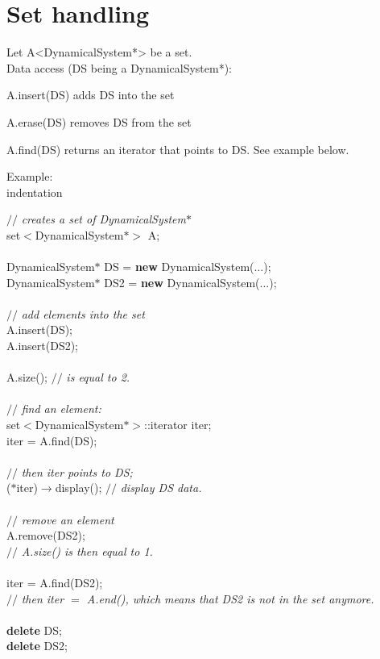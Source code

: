 \documentclass[10pt]{article}
\begin{document}
\section{Set handling}

Let A<DynamicalSystem*> be a set. \\

Data access (DS being a DynamicalSystem*):
\bei
\item A.insert(DS) adds DS into the set
\item A.erase(DS)  removes DS from the set
\item A.find(DS) returns an iterator that points to DS. See example below.
\ei

Example:\\
\expandafter\ifx\csname indentation\endcsname\relax%
\newlength{\indentation}\fi
\setlength{\indentation}{0.5em}
\begin{flushleft}
{$//$\it{} creates a set of DynamicalSystem$\ast${}\mbox{}\\
}set$<$DynamicalSystem$\ast$$>$ A;\mbox{}\\
\mbox{}\\
DynamicalSystem$\ast$ DS = {\bf new} DynamicalSystem($\ldots$);\mbox{}\\
DynamicalSystem$\ast$ DS2 = {\bf new} DynamicalSystem($\ldots$);\mbox{}\\
\mbox{}\\
{$//$\it{} add elements into the set{}\mbox{}\\
}A.insert(DS);\mbox{}\\
A.insert(DS2);\mbox{}\\
\mbox{}\\
A.size(); {$//$\it{} is equal to 2. {}\mbox{}\\
}\mbox{}\\
{$//$\it{} find an element:{}\mbox{}\\
}set$<$DynamicalSystem$\ast$$>$::iterator iter;\mbox{}\\
iter = A.find(DS);\mbox{}\\
\mbox{}\\
{$//$\it{} then iter points to DS;{}\mbox{}\\
}($\ast$iter)$\rightarrow$display(); {$//$\it{} display DS data. {}\mbox{}\\
}\mbox{}\\
{$//$\it{} remove an element{}\mbox{}\\
}A.remove(DS2); \mbox{}\\
{$//$\it{} A.size() is then equal to 1.{}\mbox{}\\
}\mbox{}\\
iter = A.find(DS2);\mbox{}\\
{$//$\it{} then iter $=$ A.end(), which means that DS2 is not in the set anymore.{}\mbox{}\\
}\mbox{}\\
{\bf delete} DS;\mbox{}\\
{\bf delete} DS2;\mbox{}\\
\end{flushleft}
\end{document}
